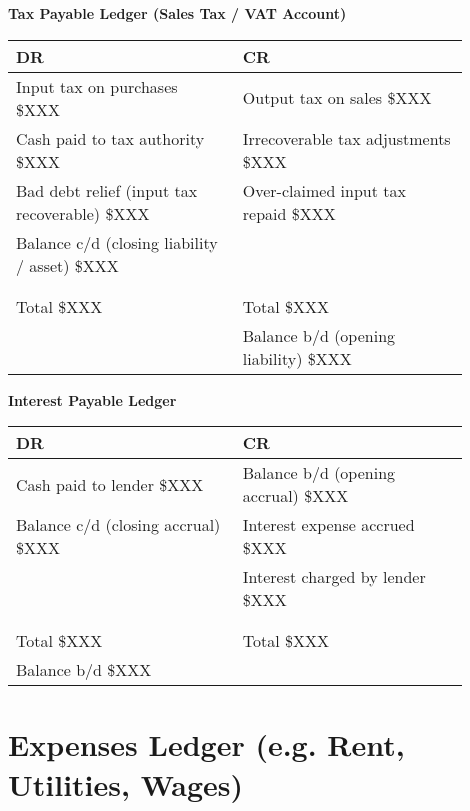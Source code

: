 \textbf{Tax Payable Ledger (Sales Tax / VAT Account)}\\[3pt]
\begin{tabular}{@{}p{0.45\linewidth} p{0.45\linewidth}@{}}
\textbf{DR} & \textbf{CR} \\ \midrule
Input tax on purchases \hfill \$XXX & Output tax on sales \hfill \$XXX \\
Cash paid to tax authority \hfill \$XXX & Irrecoverable tax adjustments \hfill \$XXX \\
Bad debt relief (input tax recoverable) \hfill \$XXX & Over-claimed input tax repaid \hfill \$XXX \\
Balance c/d (closing liability / asset) \hfill \$XXX & \\
& \\[3pt]
\multicolumn{2}{c}{\hrulefill} \\
Total \hfill \$XXX & Total \hfill \$XXX \\[6pt]
& Balance b/d (opening liability) \hfill \$XXX \\
\end{tabular}

\vspace{1cm}

\textbf{Interest Payable Ledger}\\[3pt]
\begin{tabular}{@{}p{0.45\linewidth} p{0.45\linewidth}@{}}
\textbf{DR} & \textbf{CR} \\ \midrule
Cash paid to lender \hfill \$XXX & Balance b/d (opening accrual) \hfill \$XXX \\
Balance c/d (closing accrual) \hfill \$XXX & Interest expense accrued \hfill \$XXX \\
& Interest charged by lender \hfill \$XXX \\
& \\[3pt]
\multicolumn{2}{c}{\hrulefill} \\
Total \hfill \$XXX & Total \hfill \$XXX \\[6pt]
Balance b/d \hfill \$XXX & \\
\end{tabular}


\section*{Expenses Ledger (e.g. Rent, Utilities, Wages)}

